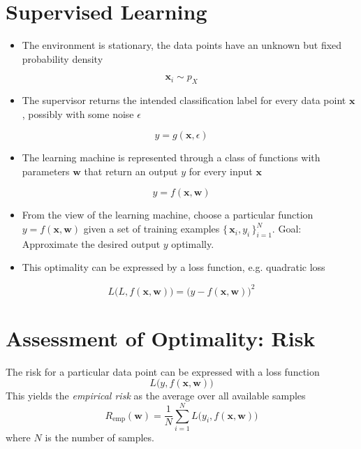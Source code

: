 \documentclass[a4paper, 11pt, accentcolor = tud3b]{tudreport}
\newcommand{\emp}{\textrm{emp}}
\renewcommand{\vec}[1]{\mathbf{#1}}
\begin{document}
		\section{Supervised Learning}
			\begin{itemize}
				\item The environment is stationary, the data points have an unknown but fixed probability density
			\end{itemize}
			\begin{equation}
				\vec{x}_i \sim p_X
			\end{equation}
			\begin{itemize}
				\item The supervisor returns the intended classification label for every data point \(\vec{x}\), possibly with some noise \( \epsilon \)
			\end{itemize}
			\begin{equation}
				y = g(\vec{x}, \epsilon)
			\end{equation}
			\begin{itemize}
				\item The learning machine is represented through a class of functions with parameters \(\vec{w}\) that return an output \(y\) for every input \(\vec{x}\)
			\end{itemize}
			\begin{equation}
				y = f(\vec{x}, \vec{w})
			\end{equation}
			
			\begin{itemize}
				\item From the view of the learning machine, choose a particular function \( y = f(\vec{x}, \vec{w}) \) given a set of training examples \( \{\, \vec{x}_i, y_i \,\}_{i = 1}^N \). Goal: Approximate the desired output \(y\) optimally.
				\item This optimality can be expressed by a loss function, e.g. quadratic loss
			\end{itemize}
			\begin{equation}
				L\big(L, f(\vec{x}, \vec{w})\big) = \big(y - f(\vec{x}, \vec{w})\big)^2
			\end{equation}

		\section{Assessment of Optimality: Risk}
			The risk for a particular data point can be expressed with a loss function
			\begin{equation}
				L\big(y, f(\vec{x}, \vec{w})\big)
			\end{equation}
			This yields the \emph{empirical risk} as the average over all available samples
			\begin{equation}
				R_\emp(\vec{w}) = \frac{1}{N} \sum_{i = 1}^{N} L\big(y_i, f(\vec{x}, \vec{w})\big)
			\end{equation}
			where \(N\) is the number of samples.
			
\end{document}
